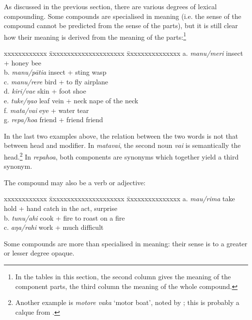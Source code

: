 As discussed in the previous section, there are various degrees of lexical compounding. Some compounds are specialised in meaning (i.e. the sense of the compound cannot be predicted from the sense of the parts), but it is still clear how their meaning is derived from the meaning of the parts:\footnote{\label{fn:269}In the tables in this section, the second column gives the meaning of the component parts, the third column the meaning of the whole compound.} 
\ea\label{ex:5.113}
\begin{tabbing}
xxxxxxxxxxxx \= xxxxxxxxxxxxxxxxxxxxx \= xxxxxxxxxxxxxxx  \kill
\textup{a.} \textit{manu/meri}  \> \textup{insect + honey}   \> \textup{bee}\\
  b. \textit{manu/pātia}  \>  {insect + sting}  \>  wasp\\
  c. \textit{manu/rere }  \>  {bird + to fly} \>   airplane\\
  d. \textit{kiri/va{\ꞌ}e} \>   {skin + foot} \>   shoe\\
  e. \textit{tuke/ŋao}  \>  {leaf vein + neck} \>   {nape of the neck}\\
  f. \textit{mata/vai}  \>  {eye + water}  \>  tear\\
  g. \textit{repa/hoa}  \>  {friend + friend} \>   friend
\end{tabbing}
\z
In the last two examples above, the relation between the two words is not that between head and modifier. In \textit{matavai}, the second noun \textit{vai} is semantically the head.\footnote{\label{fn:270}Another example is \textit{motore vaka} ‘motor boat’, noted by \citet[322]{Fischer2001Hispan}; this is probably a calque from .}\textstyleFootnoteSymbol{} In \textit{repahoa}, both components are synonyms which together yield a third synonym.

The compound may also be a verb or adjective:

\ea\label{ex:5.114}
\begin{tabbing}
xxxxxxxxxxxx \= xxxxxxxxxxxxxxxxxxxxx \= xxxxxxxxxxxxxxx  \kill
  a. \textit{ma{\ꞌ}u/rima} \>  take hold + hand  \> catch in the act, surprise\\
  b. \textit{tunu/ahi}  \> cook + fire \>  to roast on a fire\\
  c. \textit{aŋa/rahi}  \> work + much \>  difficult
\end{tabbing}
\z
Some compounds are more than specialised in meaning: their sense is to a greater or lesser degree opaque.

